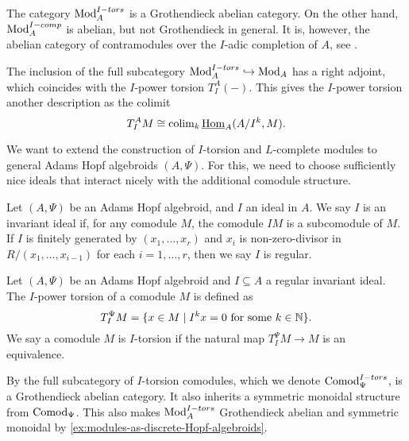 \begin{remark}
    The category $\mathrm{Mod}_A^{I-tors}$ is a Grothendieck abelian category. On the other hand, $\mathrm{Mod}_A^{I-comp}$ is abelian, but not Grothendieck in general. It is, however, the abelian category of contramodules over the $I$-adic completion of $A$, see \cite{positselski_2022_contramodules}. \citeme
\end{remark}

The inclusion of the full subcategory $\mathrm{Mod}_A^{I-tors}\hookrightarrow \mathrm{Mod}_A$ has a right adjoint, which coincides with the $I$-power torsion $T_I^A(-)$. This gives the $I$-power torsion another description as the colimit 
$$T_I^A M \cong \operatorname{colim}_k \operatorname{\underline{Hom}}_A (A/I^k, M).$$

We want to extend the construction of $I$-torsion and $L$-complete modules to general Adams Hopf algebroids $(A,\Psi)$. For this, we need to choose sufficiently nice ideals that interact nicely with the additional comodule structure. 

\begin{definition}
    Let $(A, \Psi)$ be an Adams Hopf algebroid, and $I$ an ideal in $A$. We say $I$ is an { invariant ideal} if, for any comodule $M$, the comodule $IM$ is a subcomodule of $M$. If $I$ is finitely generated by $(x_1, \ldots, x_r)$ and $x_i$ is non-zero-divisor in $R/(x_1, \ldots, x_{i-1})$ for each $i=1, \ldots, r$, then we say $I$ is { regular}. 
\end{definition}

\begin{definition}
    \label{def:I-power-torsion-comodule}
    Let $(A,\Psi)$ be an Adams Hopf algebroid and $I\subseteq A$ a regular invariant ideal. The $I$-power torsion of a comodule $M$ is defined as 
    $$T_I^\Psi M = \{x\in M \mid I^kx = 0 \text{ for some } k\in \mathbb{N}\}.$$
    We say a comodule $M$ is { $I$-torsion} if the natural map $T_I^\Psi M\longrightarrow M$ is an equivalence. 
\end{definition}

\begin{remark}
    \label{rm:torsion-comodules-grothendieck-monoidal}
    By \cite[5.10]{barthel-heard-valenzuela_2018} the full subcategory of $I$-torsion comodules, which we denote { $\mathrm{Comod}_\Psi^{I-tors}$}, is a Grothendieck abelian category. It also inherits a symmetric monoidal structure from $\mathrm{Comod}_\Psi$. This also makes $\mathrm{Mod}_A^{I-tors}$ Grothendieck abelian and symmetric monoidal by \cref{ex:modules-as-discrete-Hopf-algebroids}. 
\end{remark}

